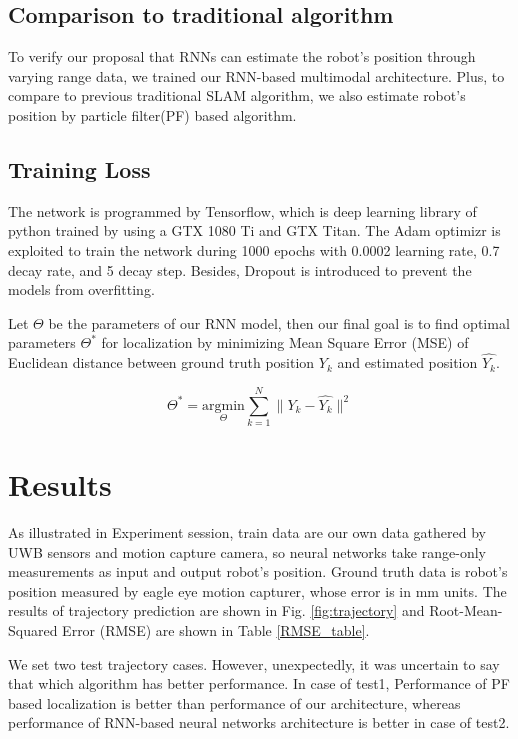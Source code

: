 \documentclass[letterpaper, 10 pt, conference]{ieeeconf}  %
\begin{document}
\subsection{Comparison to traditional algorithm}

To verify our proposal that RNNs can estimate the robot's position through varying range data, we trained our RNN-based multimodal architecture. Plus, to compare to previous traditional SLAM algorithm, we also estimate robot's position by particle filter(PF) based algorithm.

\subsection{Training Loss}

The network is programmed by Tensorflow, which is deep learning library of python trained by using a GTX 1080 Ti and GTX Titan. The Adam optimizr is exploited to train the network during 1000 epochs with 0.0002 learning rate, 0.7 decay rate, and 5 decay step. Besides, Dropout is introduced to prevent the models from overfitting. 

Let $\Theta$ be the parameters of our RNN model, then our final goal is to find optimal parameters $\Theta^{*}$ for localization by minimizing Mean Square Error (MSE) of Euclidean distance between ground truth position $Y_k$ and estimated position $\hat{Y_k}$.

\begin{equation}
\Theta^{*} = \underset{\Theta}{\mathrm{argmin}} \sum_{k=1}^N \parallel Y_k - \hat{Y_k} \parallel^{2}
\end{equation}  

\section{Results}

 As illustrated in Experiment session, train data are our own data gathered by UWB sensors and motion capture camera, so neural networks take range-only measurements as input and output robot's position. Ground truth data is robot's position measured by eagle eye motion capturer, whose error is in mm units. The results of trajectory prediction are shown in Fig. \ref{fig:trajectory} and Root-Mean-Squared Error (RMSE) are shown in Table \ref{RMSE_table}.

 We set two test trajectory cases. However, unexpectedly, it was uncertain to say that which algorithm has better performance. In case of test1, Performance of PF based localization is better than performance of our architecture, whereas performance of RNN-based neural networks architecture is better in case of test2. 
 
\end{document}

